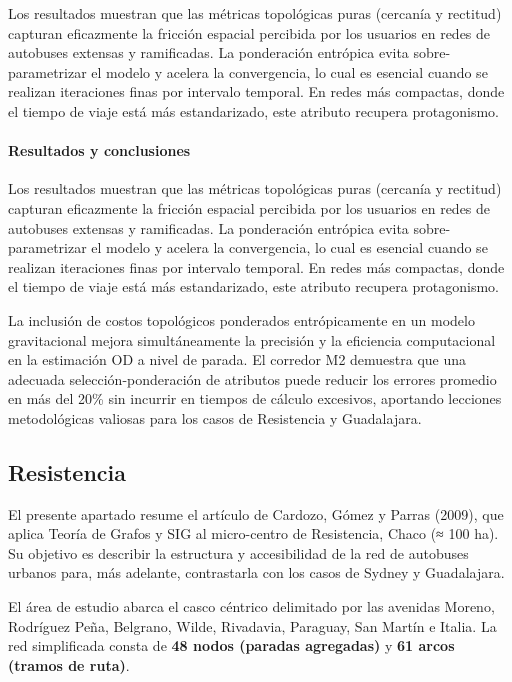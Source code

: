 \documentclass[11pt]{article}
\begin{document}
		Los resultados muestran que las métricas topológicas puras (cercanía y rectitud) capturan eficazmente la fricción espacial percibida por los usuarios en redes de autobuses extensas y ramificadas. La ponderación entrópica evita sobre-parametrizar el modelo y acelera la convergencia, lo cual es esencial cuando se realizan iteraciones finas por intervalo temporal. En redes más compactas, donde el tiempo de viaje está más estandarizado, este atributo recupera protagonismo.

		\paragraph{Resultados y conclusiones}
		Los resultados muestran que las métricas topológicas puras (cercanía y rectitud) capturan eficazmente la fricción espacial percibida por los usuarios en redes de autobuses extensas y ramificadas. La ponderación entrópica evita sobre-parametrizar el modelo y acelera la convergencia, lo cual es esencial cuando se realizan iteraciones finas por intervalo temporal. En redes más compactas, donde el tiempo de viaje está más estandarizado, este atributo recupera protagonismo.
		\bigskip

		La inclusión de costos topológicos ponderados entrópicamente en un modelo gravitacional mejora simultáneamente la precisión y la eficiencia computacional en la estimación OD a nivel de parada. El corredor M2 demuestra que una adecuada selección-ponderación de atributos puede reducir los errores promedio en más del 20\% sin incurrir en tiempos de cálculo excesivos, aportando lecciones metodológicas valiosas para los casos de Resistencia y Guadalajara.

		\subsection{Resistencia}

		El presente apartado resume el artículo de Cardozo, Gómez y Parras (2009), que aplica Teoría de Grafos y SIG al micro-centro de Resistencia, Chaco (≈ 100 ha). Su objetivo es describir la estructura y accesibilidad de la red de autobuses urbanos para, más adelante, contrastarla con los casos de Sydney y Guadalajara.

		El área de estudio abarca el casco céntrico delimitado por las avenidas Moreno, Rodríguez Peña, Belgrano, Wilde, Rivadavia, Paraguay, San Martín e Italia. La red simplificada consta de \textbf{48 nodos (paradas agregadas)} y \textbf{61 arcos (tramos de ruta)}.
\end{document}
